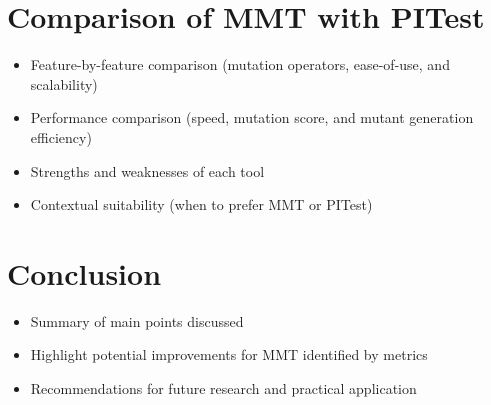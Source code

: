 \documentclass[sigplan, nonacm]{acmart}
\begin{document}
\section{Comparison of MMT with PITest}
\begin{itemize}
	\item Feature-by-feature comparison (mutation operators, ease-of-use, and scalability)
	\item Performance comparison (speed, mutation score, and mutant generation efficiency)
	\item Strengths and weaknesses of each tool
	\item Contextual suitability (when to prefer MMT or PITest)
\end{itemize}

\section{Conclusion}
\begin{itemize}
	\item Summary of main points discussed
	\item Highlight potential improvements for MMT identified by metrics
	\item Recommendations for future research and practical application
\end{itemize}



\end{document}
